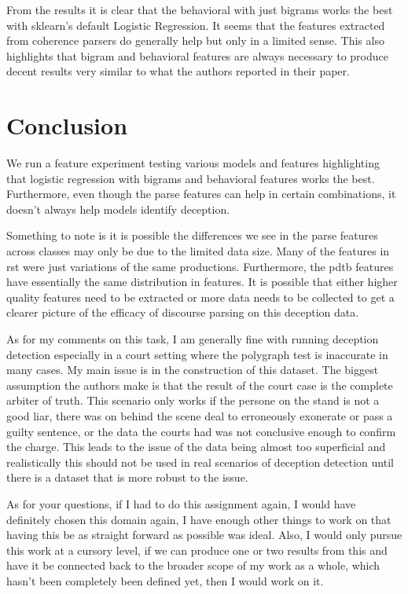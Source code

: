 \documentclass[12pt]{article}
\begin{document}
From the results it is clear that the behavioral with just bigrams works the
best with sklearn's default Logistic Regression. It seems that the features
extracted from coherence parsers do generally help but only in a limited sense.
This also highlights that bigram and behavioral features are always necessary to
produce decent results very similar to what the authors reported in their paper.

\section{Conclusion}
We run a feature experiment testing various models and features highlighting
that logistic regression with bigrams and behavioral features works the best.
Furthermore, even though the parse features can help in certain combinations, it
doesn't always help models identify deception.

Something to note is it is possible the differences we see in the parse features
across classes may only be due to the limited data size. Many of the features in
rst were just variations of the same productions. Furthermore, the pdtb features
have essentially the same distribution in features. It is possible that either
higher quality features need to be extracted or more data needs to be collected
to get a clearer picture of the efficacy of discourse parsing on this deception
data. 

As for my comments on this task, I am generally fine with running deception
detection especially in a court setting where the polygraph test is inaccurate
in many cases. My main issue is in the construction of this dataset. The biggest
assumption the authors make is that the result of the court case is the complete
arbiter of truth. This scenario only works if the persone on the stand is not a
good liar, there was on behind the scene deal to erroneously exonerate or pass a
guilty sentence, or the data the courts had was not conclusive enough to confirm
the charge. This leads to the issue of the data being almost too superficial and
realistically this should not be used in real scenarios of deception detection
until there is a dataset that is more robust to the issue.

As for your questions, if I had to do this assignment again, I would have
definitely chosen this domain again, I have enough other things to work on that
having this be as straight forward as possible was ideal. Also, I would only
pursue this work at a cursory level, if we can produce one or two results from
this and have it be connected back to the broader scope of my work as a whole,
which hasn't been completely been defined yet, then I would work on it. 



  

\printbibliography
\end{document}
